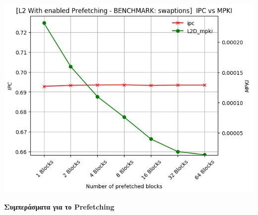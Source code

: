 \begin{minipage}{\textwidth}
    \begin{center}
        \\
        \vspace{3mm}
        \includegraphics[scale=0.70]{graphs/PREF/swaptions.png}
        \vspace{6mm}
    \end{center}
\end{minipage}



\begin{minipage}{\textwidth}
    \begin{center}
\textbf{Συμπεράσματα για το \textlatin{Prefetching}}    
    \end{center}
\end{minipage}

